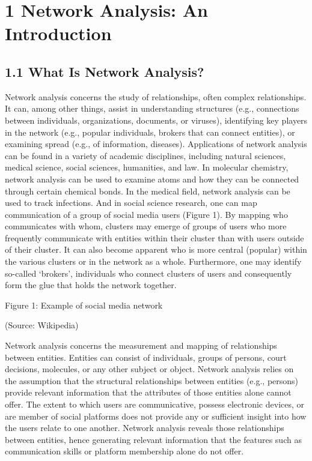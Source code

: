 

    

    
    

    
    \hypertarget{network-analysis-an-introduction}{%
\section{1 Network Analysis: An
Introduction}\label{network-analysis-an-introduction}}

    \hypertarget{what-is-network-analysis}{%
\subsection{1.1 What Is Network
Analysis?}\label{what-is-network-analysis}}

Network analysis concerns the study of relationships, often complex
relationships. It can, among other things, assist in understanding
structures (e.g., connections between individuals, organizations,
documents, or viruses), identifying key players in the network (e.g.,
popular individuals, brokers that can connect entities), or examining
spread (e.g., of information, diseases). Applications of network
analysis can be found in a variety of academic disciplines, including
natural sciences, medical science, social sciences, humanities, and law.
In molecular chemistry, network analysis can be used to examine atoms
and how they can be connected through certain chemical bonds. In the
medical field, network analysis can be used to track infections. And in
social science research, one can map communication of a group of social
media users (Figure 1). By mapping who communicates with whom, clusters
may emerge of groups of users who more frequently communicate with
entities within their cluster than with users outside of their cluster.
It can also become apparent who is more central (popular) within the
various clusters or in the network as a whole. Furthermore, one may
identify so-called `brokers', individuals who connect clusters of users
and consequently form the glue that holds the network together.

Figure 1: Example of social media network

(Source: Wikipedia)

Network analysis concerns the measurement and mapping of relationships
between entities. Entities can consist of individuals, groups of
persons, court decisions, molecules, or any other subject or object.
Network analysis relies on the assumption that the structural
relationships between entities (e.g., persons) provide relevant
information that the attributes of those entities alone cannot offer.
The extent to which users are communicative, possess electronic devices,
or are member of social platforms does not provide any or sufficient
insight into how the users relate to one another. Network analysis
reveals those relationships between entities, hence generating relevant
information that the features such as communication skills or platform
membership alone do not offer.

